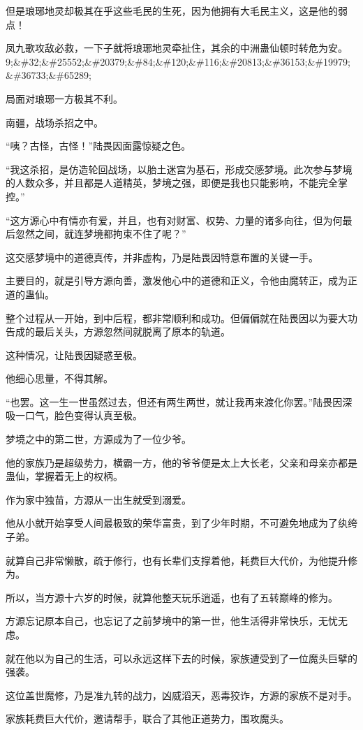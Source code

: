 \begin{this_body}
但是琅琊地灵却极其在乎这些毛民的生死，因为他拥有大毛民主义，这是他的弱点！

凤九歌攻敌必救，一下子就将琅琊地灵牵扯住，其余的中洲蛊仙顿时转危为安。9;\&\#32;\&\#25552;\&\#20379;\&\#84;\&\#120;\&\#116;\&\#20813;\&\#36153;\&\#19979;\&\#36733;\&\#65289;

局面对琅琊一方极其不利。

南疆，战场杀招之中。

“咦？古怪，古怪！”陆畏因面露惊疑之色。

“我这杀招，是仿造轮回战场，以胎土迷宫为基石，形成交感梦境。此次参与梦境的人数众多，并且都是人道精英，梦境之强，即便是我也只能影响，不能完全掌控。”

“这方源心中有情亦有爱，并且，也有对财富、权势、力量的诸多向往，但为何最后忽然之间，就连梦境都拘束不住了呢？”

这交感梦境中的道德真传，并非虚构，乃是陆畏因特意布置的关键一手。

主要目的，就是引导方源向善，激发他心中的道德和正义，令他由魔转正，成为正道的蛊仙。

整个过程从一开始，到中后程，都非常顺利和成功。但偏偏就在陆畏因以为要大功告成的最后关头，方源忽然间就脱离了原本的轨道。

这种情况，让陆畏因疑惑至极。

他细心思量，不得其解。

“也罢。这一生一世虽然过去，但还有两生两世，就让我再来渡化你罢。”陆畏因深吸一口气，脸色变得认真至极。

梦境之中的第二世，方源成为了一位少爷。

他的家族乃是超级势力，横霸一方，他的爷爷便是太上大长老，父亲和母亲亦都是蛊仙，掌握着无上的权柄。

作为家中独苗，方源从一出生就受到溺爱。

他从小就开始享受人间最极致的荣华富贵，到了少年时期，不可避免地成为了纨绔子弟。

就算自己非常懒散，疏于修行，也有长辈们支撑着他，耗费巨大代价，为他提升修为。

所以，当方源十六岁的时候，就算他整天玩乐逍遥，也有了五转巅峰的修为。

方源忘记原本自己，也忘记了之前梦境中的第一世，他生活得非常快乐，无忧无虑。

就在他以为自己的生活，可以永远这样下去的时候，家族遭受到了一位魔头巨擘的强袭。

这位盖世魔修，乃是准九转的战力，凶威滔天，恶毒狡诈，方源的家族不是对手。

家族耗费巨大代价，邀请帮手，联合了其他正道势力，围攻魔头。


\end{this_body}
